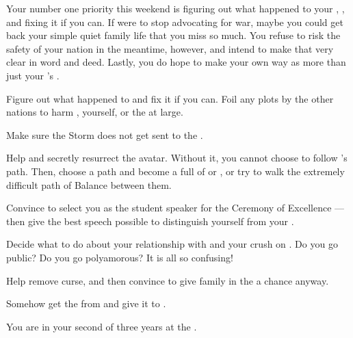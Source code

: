 \documentclass[char]{GL2020}
\begin{document}
Your number one priority this weekend is figuring out what happened to your \cLoud{\parent}, \cLoud{}, and fixing it if you can. If \cLoud{\they} were to stop advocating for war, maybe you could get back your simple quiet family life that you miss so much. You refuse to risk the safety of your nation in the meantime, however, and intend to make that very clear in word and deed. Lastly, you do hope to make your own way as more than just your \cLoud{\parent}'s \cWarlordDaughter{\offspring}.

\begin{itemz}
    \item Figure out what happened to \cLoud{} and fix it if you can. Foil any plots by the other nations to harm \cLoud{}, yourself, or the \pShip{} at large.
    \item Make sure the Storm does not get sent to the \pShip{}.
    \item Help \cFlowPriest{} and \cEbbPriest{} secretly resurrect the \cEbb{} avatar. Without it, you cannot choose to follow \cEbb{}'s path. Then, choose a path and become a full \cWarlordDaughter{\cleric} of \cEbb{} or \cFlow{}, or try to walk the extremely difficult path of Balance between them.
    \item Convince \cMusic{} to select you as the student speaker for the Ceremony of Excellence — then give the best speech possible to distinguish yourself from your \cLoud{\parent}.
    \item Decide what to do about your relationship with \cTechStar{} and your crush on \cInitiate{}. Do you go public? Do you go polyamorous? It is all so confusing!
    \item Help \cInitiate{} remove \cInitiate{\their} curse, and then convince \cInitiate{\them} to give \cInitiate{\their} family in the \pFarm{} a chance anyway.
    \item Somehow get the \iMirror{} from \cDiplomat{} and give it to \cHeir{}.
\end{itemz}

\begin{itemz}[Notes]
    \item You are in your second of three years at the \pSchool{}.
\end{itemz}
\end{document}
